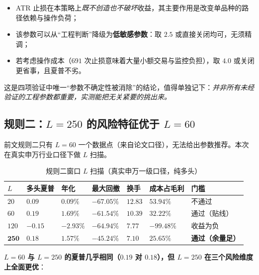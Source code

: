 \begin{itemize}[leftmargin=2.2em]
  \item ATR 止损在本策略上\emph{既不创造也不破坏}收益，其主要作用是改变单品种的路径依赖与操作负荷；
  \item 该参数可以从“工程判断”降级为\textbf{低敏感参数}：取 $2.5$ 或直接关闭均可，无须精调；
  \item 若考虑操作成本（$691$ 次止损意味着大量小额交易与监控负担），取 $4.0$ 或关闭更省事，且夏普不劣。
\end{itemize}

这是四项验证中唯一“参数不确定性被消除”的结论，值得单独记下：\emph{并非所有未经验证的工程参数都重要，实测能把无关紧要的挑出来。}

\subsection{规则二：$L=250$ 的风险特征优于 $L=60$}

前文规则二只有 $L=60$ 一个数据点（来自论文口径），无法给出参数推荐。本次在真实申万行业口径下做 $L$ 扫描。

\begin{table}[htbp]
\centering\footnotesize
\caption{规则二窗口 $L$ 扫描（真实申万一级口径，纯多头）}\label{tab:r2L}
\begin{tabular}{@{}>{\raggedright\arraybackslash}p{1.3cm}>{\raggedright\arraybackslash}p{1.9cm}>{\raggedright\arraybackslash}p{1.9cm}>{\raggedright\arraybackslash}p{2.1cm}>{\raggedright\arraybackslash}p{1.7cm}>{\raggedright\arraybackslash}p{2.0cm}>{\raggedright\arraybackslash}p{1.8cm}@{}}
\toprule
\textbf{$L$} & \textbf{多头夏普} & \textbf{年化} & \textbf{最大回撤} & \textbf{换手} & \textbf{成本占毛利} & \textbf{门槛} \\
\midrule
$20$  & $0.09$ & $0.09\%$ & $-67.05\%$ & $12.83$ & $53.94\%$ & 不通过 \\
$60$  & $0.19$ & $1.69\%$ & $-61.54\%$ & $10.39$ & $32.22\%$ & 通过（贴线） \\
$120$ & $-0.15$ & $-2.93\%$ & $-64.94\%$ & $7.77$ & $-99.48\%$ & 收益为负 \\
$\mathbf{250}$ & $\mathbf{0.18}$ & $1.57\%$ & $\mathbf{-45.24\%}$ & $\mathbf{7.10}$ & $\mathbf{25.65\%}$ & \textbf{通过（余量足）} \\
\bottomrule
\end{tabular}
\end{table}

\textbf{$L=60$ 与 $L=250$ 的夏普几乎相同（$0.19$ 对 $0.18$），但 $L=250$ 在三个风险维度上全面更优}：

